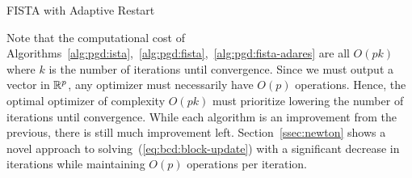 \begin{algorithm}
    \caption{FISTA with Adaptive Restart}\label{alg:pgd:fista-adares}
\end{algorithm}

Note that the computational cost of 
Algorithms~\ref{alg:pgd:ista},~\ref{alg:pgd:fista},~\ref{alg:pgd:fista-adares}
are all $O(p k)$ where $k$ is the number of iterations until convergence.
Since we must output a vector in $\mathbb{R}^p$, 
any optimizer must necessarily have $O(p)$ operations.
Hence, the optimal optimizer of complexity $O(pk)$ must prioritize lowering 
the number of iterations until convergence.
While each algorithm is an improvement from the previous,
there is still much improvement left.
Section~\ref{ssec:newton} shows a novel approach to solving~(\ref{eq:bcd:block-update})
with a significant decrease in iterations while maintaining $O(p)$ operations per iteration.

